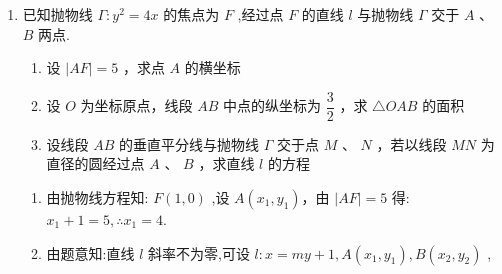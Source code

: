 \begin{enumerate}
\begin{jieda}
\begin{enumerate}
            因此可得 ${AB} = {AF} + {BF} = {x}_{1} + 1 + {x}_{2} + 1 = {16}$，即以线段 ${AB}$ 为直径的圆直径为 16,可得圆面积 ${64\pi }$

            \item $\dfrac{S_1}{S_{\triangle ABG}} = \dfrac{|y_A|}{|y_A - y_B|}$，$\dfrac{S_2}{S_{\triangle ACG}} = \dfrac{|y_C|}{|y_A - y_C|}$

            根据重心性质可知$S_{\triangle ABG} = S_{\triangle ACG}$，因此$\dfrac{S_1}{S_2} = \dfrac{|y_A|}{|y_A - y_B|} \times \dfrac{|y_A-y_C|}{|y_C|}$

            根据重心性质可知$y_A + y_B + y_C = 0$，故$\dfrac{S_1}{S_2} = \dfrac{|y_A|}{|y_A - y_B|} \times \dfrac{|2y_A+y_B|}{|y_A+y_B|} = \left|\dfrac{2y_A^2+y_Ay_B}{y_A^2 - y_B^2}\right| = \left|\dfrac{2+\dfrac{y_B}{y_A}}{1-\left(\dfrac{y_B}{y_A}\right)^2}\right|$

            因为$Q$在点 $F$ 的右侧，故$|y_A| > |y_B|$，即$\dfrac{y_B}{y_A} \in (-1, 0)$，故$\dfrac{S_1}{S_2} = \dfrac{2+\dfrac{y_B}{y_A}}{1-\left(\dfrac{y_B}{y_A}\right)^2}$，设$t = 2+\dfrac{y_B}{y_A}$，$t \in (1, 3)$，$\dfrac{S_1}{S_2} = \dfrac{t}{-t^2+4t-3} = \dfrac{1}{4-t - \dfrac{3}{t}} \geq \dfrac{1}{4-2\sqrt{3}} = \dfrac{4+2\sqrt{3}}{4}$，当$t = \sqrt{3}$时取等号.

            $3x_G = x_A+x_B+x_C = \dfrac{y_A^2+y_B^2+y_C^2}{4} = \dfrac{2(y_A^2+y_B^2)+2y_Ay_B}{4}$

            $\dfrac{y_B}{y_A} = \sqrt{3}-2$，$AB:x = my+1$，与抛物线联立可得$y^2-4my-4=0$，因此$y_Ay_B = -4$，故$\left\{\begin{array}{l}
                 y_A^2 = 4(2+\sqrt{3}) \\
                 y_B^2 = 4(2-\sqrt{3})
            \end{array}\right.$，因此$x_G = 2$，$G(2, 0)$
        \end{enumerate}
    \end{jieda}
    \item 已知抛物线 $\Gamma : y^2 = 4x$ 的焦点为 $F$ ,经过点 $F$ 的直线 $l$ 与抛物线 $\Gamma$ 交于 ${A}$ 、 $B$ 两点.
    \begin{enumerate}
        \item 设 $|AF| = 5$ ，求点 $A$ 的横坐标
        \item 设 $O$ 为坐标原点，线段 $AB$ 中点的纵坐标为 $\dfrac{3}{2}$ ，求 $\bigtriangleup OAB$ 的面积
        \item 设线段 $AB$ 的垂直平分线与抛物线 $\Gamma$ 交于点 $M$ 、 $N$ ，若以线段 $MN$ 为直径的圆经过点 $A$ 、 $B$ ，求直线 $l$ 的方程
    \end{enumerate}
    \begin{jieda}
        \begin{enumerate}
            \item 由抛物线方程知: $F(1,0)$ ,设 $A(x_1,y_1)$，由 $|AF| = 5$ 得: $x_1 + 1 = 5,\therefore x_1 = 4$.
            \item 由题意知:直线 $l$ 斜率不为零,可设 $l : x = my + 1,A(x_1,y_1) ,B(x_2,y_2)$ ,


\end{enumerate}
\end{jieda}
\end{enumerate}
